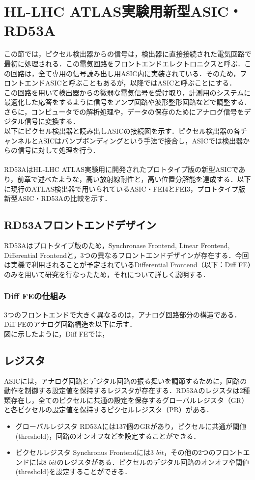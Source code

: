 \section{HL-LHC ATLAS実験用新型ASIC・RD53A}
この節では，ピクセル検出器からの信号は，検出器に直接接続された電気回路で最初に処理される．この電気回路をフロントエンドエレクトロニクスと呼ぶ．この回路は，全て専用の信号読み出し用ASIC内に実装されている．そのため，フロントエンドASICと呼ぶこともあるが，以降ではASICと呼ぶことにする．\\
この回路を用いて検出器からの微弱な電気信号を受け取り，計測用のシステムに最適化した応答をするように信号をアンプ回路や波形整形回路などで調整する．さらに，コンピュータでの解析処理や，データの保存のためにアナログ信号をデジタル信号に変換する．\\
以下にピクセル検出器と読み出しASICの接続図を示す．ピクセル検出器の各チャンネルとASICはバンプボンディングという手法で接合し，ASICでは検出器からの信号に対して処理を行う．\\

\\

RD53AはHL-LHC ATLAS実験用に開発されたプロトタイプ版の新型ASICであり，前章で述べたような，高い放射線耐性と，高い位置分解能を達成する．以下に現行のATLAS検出器で用いられているASIC・FEI4とFEI3，プロトタイプ版新型ASIC・RD53Aの比較を示す．

\subsection{RD53Aフロントエンドデザイン}
RD53Aはプロトタイプ版のため，Synchronase Frontend, Linear Frontend, Differential Frontendと，3つの異なるフロントエンドデザインが存在する．今回は実機で利用されることが予定されているDifferential Frontend（以下：Diff FE）のみを用いて研究を行なったため，それについて詳しく説明する．

\subsubsection{Diff FEの仕組み}
3つのフロントエンドで大きく異なるのは，アナログ回路部分の構造である．Diff FEのアナログ回路構造を以下に示す．\\


図に示したように，Diff FEでは，

\subsection{レジスタ}
ASICには，アナログ回路とデジタル回路の振る舞いを調節するために，回路の動作を制御する設定値を保持するレジスタが存在する．RD53Aのレジスタは2種類存在し，全てのピクセルに共通の設定を保存するグローバルレジスタ（GR）と各ピクセルの設定値を保持するピクセルレジスタ（PR）がある．
\begin{itemize}
\item グローバルレジスタ
  RD53Aには137個のGRがあり，ピクセルに共通が閾値(threshold)，回路のオンオフなどを設定することができる．
\item ピクセルレジスタ
  Synchronus Frontendには3 $bit$，その他の2つのフロントエンドには8 $bit$のレジスタがある．ピクセルのデジタル回路のオンオフや閾値(threshold)を設定することができる．
\end{itemize}


